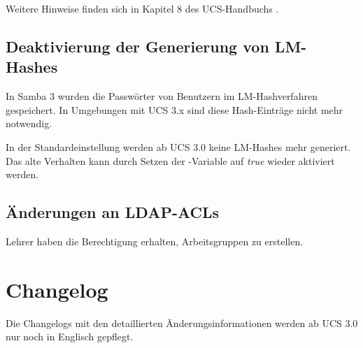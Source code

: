 Weitere Hinweise finden sich in Kapitel 8 des UCS-Handbuchs \cite{UCS-Handbuch}.

\section{Deaktivierung der Generierung von LM-Hashes}
In Samba 3 wurden die Passwörter von Benutzern im LM-Hashverfahren gespeichert.
In Umgebungen mit UCS 3.x sind diese Hash-Einträge nicht mehr notwendig. 

In der Standardeinstellung werden ab UCS 3.0 keine LM-Hashes mehr generiert. Das alte Verhalten kann durch
Setzen der \ucsUCR{}-Variable  auf \emph{true} wieder aktiviert 
werden.

\section{Änderungen an LDAP-ACLs}
Lehrer haben die Berechtigung erhalten, Arbeitsgruppen zu erstellen.


\chapter{Changelog}

Die Changelogs mit den detaillierten Änderungsinformationen werden ab UCS 3.0
nur noch in Englisch gepflegt.







